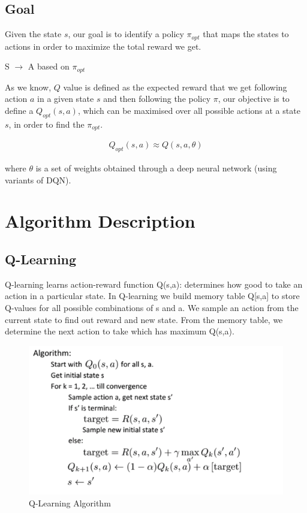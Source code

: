 \subsection{Goal}

Given the state $s$, our goal is to identify a policy $\pi_{opt}$ that maps the states to actions in order to maximize the total reward we get.

\begin{center}
S $\rightarrow$ A based on $\pi_{opt}$
\end{center}

As we know, $Q$ value is defined as the expected reward that we get following action $a$ in a given state $s$ and then following the policy $\pi$, our objective is to define a $Q_{opt} (s, a)$, which can be maximised over all possible actions at a state $s$, in order to find the $\pi_{opt}$.

\begin{align*}
Q_{opt} (s,a) \approx Q(s, a, \theta)
\end{align*}

where $\theta$ is a set of weights obtained through a deep neural network (using variants of DQN).

\section{Algorithm Description}

\subsection{Q-Learning}
Q-learning learns action-reward function Q(s,a): determines how good to take an action in a particular state. In Q-learning we build memory table Q[s,a] to store Q-values for all possible combinations of s and a. We sample an action from the current state to find out reward  and new state. From the memory table, we determine the next action to take which has maximum Q(s,a).

\begin{figure}%
\centering
\includegraphics[width=0.6\columnwidth]{figures/Q-learning.png}%
\caption{Q-Learning Algorithm}%
\label{fig:datastats}%
\end{figure}


